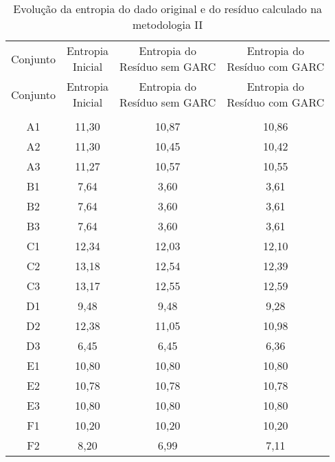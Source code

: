 \begin{center}
\begin{longtable}{cccc}
\toprule
\rowcolor{white}
\caption[Metodologia II: evolução da entropia]{Evolução da entropia do dado
original e do resíduo calculado na metodologia II}
\label{tab:EvolucaoEntropiaMet2}\\
\midrule
Conjunto & \specialcell{Entropia \\Inicial} & \specialcell{Entropia do
\\Resíduo sem GARC} & \specialcell{Entropia do
\\Resíduo com GARC}  \\
\midrule
\endfirsthead
\midrule
\rowcolor{white}
Conjunto & \specialcell{Entropia \\Inicial} & \specialcell{Entropia do
\\Resíduo sem GARC} & \specialcell{Entropia do
\\Resíduo com GARC}  \\
\toprule
\endhead
\midrule \\ %
\endfoot
\bottomrule 
\endlastfoot
    A1    & 11,30 & 10,87 & 10,86 \\
    A2    & 11,30 & 10,45 & 10,42 \\
    A3    & 11,27 & 10,57 & 10,55 \\
    B1    & 7,64  & 3,60  & 3,61 \\
    B2    & 7,64  & 3,60  & 3,61 \\
    B3    & 7,64  & 3,60  & 3,61 \\
    C1    & 12,34 & 12,03 & 12,10 \\
    C2    & 13,18 & 12,54 & 12,39 \\
    C3    & 13,17 & 12,55 & 12,59 \\
    D1    & 9,48  & 9,48  & 9,28 \\
    D2    & 12,38 & 11,05 & 10,98 \\
    D3    & 6,45  & 6,45  & 6,36 \\
    E1    & 10,80 & 10,80 & 10,80 \\
    E2    & 10,78 & 10,78 & 10,78 \\
    E3    & 10,80 & 10,80 & 10,80 \\
    F1    & 10,20 & 10,20 & 10,20 \\
    F2    & 8,20  & 6,99  & 7,11 \\

\end{longtable}
\end{center}
